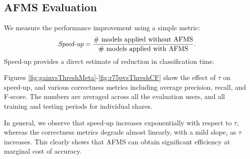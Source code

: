 
\subsection{AFMS Evaluation}
\label{sec:exptspeedup}
We measure the performance improvement using a simple metric:
\begin{equation}
\label{eq:speedupgain} 
\mbox{{\it Speed-up}} = \frac{\mbox{\# models applied without AFMS}}{\mbox{\# models applied with AFMS}}.
\end{equation}
Speed-up provides a direct estimate of reduction in classification
time.


\begin{figure}
\begin{minipage}{.95\textwidth}
\centering
{}

\label{fig:gainvsThreshMeta}
\end{minipage}
\begin{minipage}{.95\textwidth}
\centering
{}

\label{fig:gainvsThreshCF}
\end{minipage}

\end{figure}


Figures \ref{fig:gainvsThreshMeta}-\ref{fig:r75pvsThreshCF} show the
effect of $\tau$ on speed-up, and various correctness metrics including
average precision, recall, and F-score.  The numbers are averaged across all
the evaluation users, and all training and testing periods for
individual shares.

In general, we observe that speed-up increases exponentially with
respect to $\tau$, whereas the correctness metrics degrade almost linearly,
with a mild slope, as $\tau$ increases.  This clearly shows that AFMS
can obtain significant efficiency at marginal cost of accuracy.



